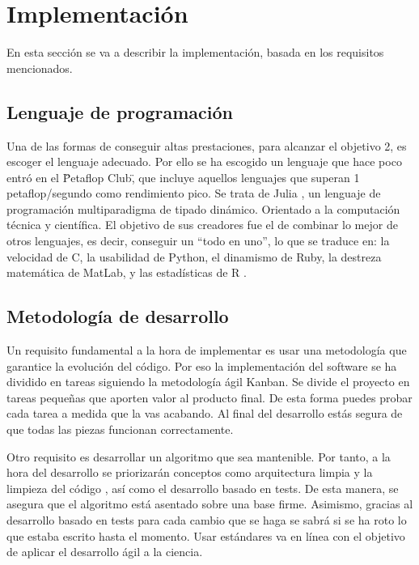 \chapter{Implementación}
En esta sección se va a describir la implementación, basada en los requisitos mencionados.

\section{Lenguaje de programación}

Una de las formas de conseguir altas prestaciones, para alcanzar el objetivo 2, es escoger el lenguaje adecuado. Por ello se ha escogido
un lenguaje que hace poco entró en el \"Petaflop Club\", que incluye aquellos lenguajes que superan 1 petaflop/segundo como rendimiento pico. Se trata
de Julia \cite{julia}, un lenguaje de programación multiparadigma de tipado dinámico. Orientado a la computación técnica y
científica. El objetivo de sus creadores fue el de combinar lo mejor de otros lenguajes, es decir, conseguir un “todo en uno”, lo que se traduce en:
la velocidad de C, la usabilidad de Python, el dinamismo de Ruby, la destreza matemática de MatLab, y las estadísticas de R \cite{julia_goals}.

\section{Metodología de desarrollo}

Un requisito fundamental a la hora de implementar es usar una metodología que garantice la evolución del código. Por eso la implementación 
del software se ha dividido en tareas siguiendo la metodología ágil Kanban. Se divide el proyecto en tareas pequeñas que aporten valor al producto 
final. De esta forma puedes probar cada tarea a medida que la vas acabando. Al final del desarrollo estás segura de que todas las piezas funcionan
correctamente.

Otro requisito es desarrollar un algoritmo que sea mantenible. Por tanto, a la hora del desarrollo se priorizarán conceptos 
como arquitectura limpia \cite{cleanArquitecture2017} y la limpieza del código \cite{cleanCode2008}, así como el desarrollo basado en tests. De esta manera, se asegura
que el algoritmo está asentado sobre una base firme. Asimismo, gracias al desarrollo basado en tests para cada cambio que se haga
se sabrá si se ha roto lo que estaba escrito hasta el momento.  Usar estándares va en línea con el objetivo de aplicar el desarrollo ágil a la ciencia.

